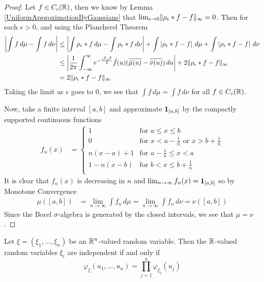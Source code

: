 \begin{proof}
Let $f \in C_c(\mathbb{R})$, then we know by Lemma
\ref{UniformApproximationByGaussians} that $\lim_{\epsilon \to 0}
\lVert \rho_\epsilon * f - f \rVert_\infty = 0$.  Then for each $\epsilon >
0$, and using the Plancherel Theorem
\begin{align*}
\left \vert \int f \, d\mu - \int f \, d\nu \right \vert &\leq \left \vert \int \rho_\epsilon *
  f \, d\mu - \int \rho_\epsilon * f \, d\nu \right \vert + \int \left \vert \rho_\epsilon *
  f  - f \right \vert\, d\mu + \int \left \vert \rho_\epsilon *
  f  - f \right \vert\, d\nu \\
&\leq \left \vert \frac{1}{2\pi} \int_{-\infty}^\infty e^{-\frac{\epsilon^2
      u^2}{2}} \hat{f}(u) (\overline{\hat{\mu}(u)} - \overline{\hat{\nu}(u)})\, du \right \vert+ 2\lVert \rho_\epsilon *
  f  - f \rVert_\infty \\
&=  2\lVert \rho_\epsilon *
  f  - f \rVert_\infty 
\end{align*}
Taking the limit as $\epsilon$ goes to $0$, we see that $\int f \,
d\mu = \int f \, d\nu$ for all $f \in C_c(\mathbb{R})$.

Now, take a finite interval $[a,b]$ and approximate
$\textbf{1}_{[a,b]}$ by the compactly supported continuous
functions
\begin{align*}
f_n(x) &= \begin{cases}
1 & \text{for $a \leq x \leq b$} \\
0 & \text{for $x < a- \frac{1}{n}$ or $x > b + \frac{1}{n}$} \\
n(x-a) + 1 & \text{for $a-\frac{1}{n} \leq x < a$} \\
1 - n(x-b)& \text{for $b < x \leq b + \frac{1}{n}$} \\
\end{cases}
\end{align*}
It is clear that $f_n(x)$ is decreasing in $n$ and $\lim_{n \to
  \infty}f_n(x) = \textbf{1}_{[a,b]}$ so by Monotone Convergence
\begin{align*}
\mu([a,b]) &= \lim_{n \to \infty} \int f_n \,
d\mu = \lim_{n \to \infty} \int f_n \,
d\nu = \nu([a,b])
\end{align*}
Since the Borel $\sigma$-algebra is generated by the closed intervals,
we see that $\mu = \nu$.
\end{proof}
\begin{thm} Let $\xi = \left( \xi_1, \ldots , \xi_n \right)$ be an
    $\mathbb{R}^n$-valued random variable.  Then the $\mathbb{R}$-valued
    random variables $\xi_i$ are independent if and only if 
\begin{equation*}
\varphi_\xi(u_1, \ldots , u_n) = \prod_{j=1}^n \varphi_{\xi_j}(u_j)
\end{equation*}
\end{thm}

